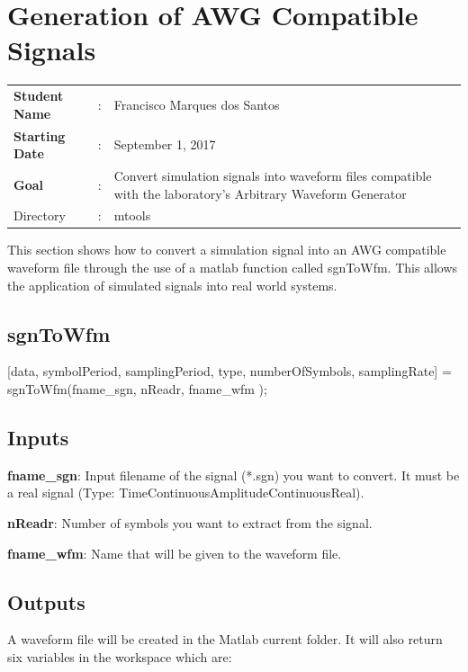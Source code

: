 \clearpage

\section{Generation of AWG Compatible Signals}

\begin{tcolorbox}	
\begin{tabular}{p{2.75cm} p{0.2cm} p{10.5cm}} 	
\textbf{Student Name}  &:& Francisco Marques dos Santos\\
\textbf{Starting Date} &:& September 1, 2017\\
\textbf{Goal}          &:& Convert simulation signals into waveform files compatible with the laboratory's Arbitrary Waveform Generator\\
Directory              &:& mtools
\end{tabular}
\end{tcolorbox}


This section shows how to convert a simulation signal into an AWG compatible waveform file through the use of a matlab function called sgnToWfm. This allows the application of simulated signals into real world systems.

\subsection{sgnToWfm}

[data, symbolPeriod, samplingPeriod, type, numberOfSymbols, samplingRate] = sgnToWfm(fname\_sgn, nReadr, fname\_wfm );

\subsection*{Inputs}

\indent

\textbf{fname\_sgn}: Input filename of the signal (*.sgn) you want to convert. It must be a real signal (Type: TimeContinuousAmplitudeContinuousReal).
\bigskip

\textbf{nReadr}: Number of symbols you want to extract from the signal.
\bigskip

\textbf{fname\_wfm}: Name that will be given to the waveform file.

\subsection*{Outputs}
A waveform file will be created in the Matlab current folder. It will also return six variables in the workspace which are:
\bigskip

